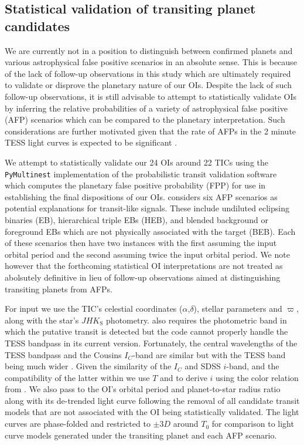 \subsection{Statistical validation of transiting planet candidates} \label{sect:vespa}
We are currently not in a position to distinguish between confirmed planets and various astrophysical false
positive scenarios in an absolute sense. This is because of the lack of follow-up observations in this study
which are ultimately required to validate or disprove the planetary nature of our OIs. 
Despite the lack of such follow-up observations, it is still advisable to attempt to statistically
validate OIs by inferring the relative probabilities of a variety of astrophysical false
positive (AFP) scenarios which can be compared to the planetary interpretation.
Such considerations are further motivated given that the rate of AFPs in
the 2 minute TESS light curves is expected to be significant \citep[$\sim 60$\%;][]{sullivan15}.

We attempt to statistically validate our 24 OIs around 22 TICs using the \texttt{PyMultinest}
\citep{buchner14} implementation of the probabilistic transit validation software
\vespa{} \citep{morton12,morton15} which computes the planetary false positive probability (FPP)
for use in establishing the final dispositions of our OIs.
\vespa{} considers six AFP scenarios as potential explanations for transit-like
signals. These include undiluted eclipsing binaries (EB), hierarchical triple EBs (HEB), and blended
background or foreground EBs which are not physically associated with the target (BEB). Each of
these scenarios then have two instances with the first assuming the input orbital period and the
second assuming twice the input orbital period.
We note however that the forthcoming statistical OI interpretations are not treated as abolsutely
definitive in lieu of follow-up observations aimed at distinguishing transiting planets from AFPs.

For \vespa{} input we use the TIC's celestial coordinates ($\alpha$,$\delta$),
stellar parameters \teff{,} \logg{,} and $\varpi$, along
with the star's $JHK_{\text{S}}$ photometry. \vespa{} also requires the photometric band in which the
putative transit is detected but the code cannot properly handle the TESS bandpass in its current
version. Fortunately, the central wavelengths of the TESS bandpass and the Cousins $I_C$-band
are similar but with the TESS band being much wider \citep{sullivan15}. Given the similarity of the
$I_C$ and SDSS $i$-band, and the compatibility of the latter within \vespa{,} we use $T$ and
\Ks{} to derive $i$ using the color relation from \cite{muirhead18}. We also pass to \vespa{} the
OI's orbital period and planet-to-star radius ratio along with 
its de-trended light curve following the removal of all candidate transit models that are not associated
with the OI being statistically validated. The light curves are phase-folded and restricted
to $\pm 3D$ around $T_0$ for comparison to light curve models generated under the transiting planet
and each AFP scenario.


